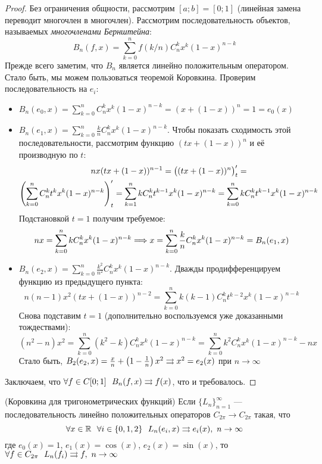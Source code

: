\begin{proof}
	Без ограничения общности, рассмотрим $[a; b] = [0; 1]$ (линейная замена переводит многочлен в многочлен). Рассмотрим последовательность объектов, называемых \textit{многочленами Бернштейна}:
	\[
		B_n(f, x) = \sum_{k = 0}^n f(k / n) C_n^k x^k(1 - x)^{n - k}
	\]
	Прежде всего заметим, что $B_n$ является линейно положительным оператором. Стало быть, мы можем пользоваться теоремой Коровкина. Проверим последовательность на $e_i$:
	\begin{itemize}
		\item \(B_n(e_0, x) = \sum_{k = 0}^n C_n^k x^k(1 - x)^{n - k} = (x + (1 - x))^n = 1 = e_0(x)\)
		
		\item \(B_n(e_1, x) = \sum_{k = 0}^n \frac{k}{n} C_n^k x^k(1 - x)^{n - k}\). Чтобы показать сходимость этой последовательности, рассмотрим функцию $(tx + (1 - x))^n$ и её производную по $t$:
		\begin{multline*}
			nx(tx + (1 - x))^{n - 1} = \big((tx + (1 - x))^n\big)'_t =
			\\
			\left(\sum_{k = 0}^n C_n^k t^k x^k (1 - x)^{n - k}\right)'_t = \sum_{k = 1}^n kC_n^k t^{k - 1}x^k(1 - x)^{n - k} = \sum_{k = 0}^n kC_n^k t^{k - 1}x^k(1 - x)^{n - k}
		\end{multline*}
		Подстановкой $t = 1$ получим требуемое:
		\[
			nx = \sum_{k = 0}^n kC_n^kx^k(1 - x)^{n - k} \Longrightarrow x = \sum_{k = 0}^n \frac{k}{n} C_n^k x^k(1 - x)^{n - k} = B_n(e_1, x)
		\]
		
		\item \(B_n(e_2, x) = \sum_{k = 0}^n \frac{k^2}{n^2} C_n^k x^k(1 - x)^{n - k}\). Дважды продифференцируем функцию из предыдущего пункта:
		\[
			n(n - 1)x^2(tx + (1 - x))^{n - 2} = \sum_{k = 0}^n k(k - 1)C_n^k t^{k - 2} x^k(1 - x)^{n - k}
		\]
		Снова подставим $t = 1$ (дополнительно воспользуемся уже доказанными тождествами):
		\[
			(n^2 - n)x^2 = \sum_{k = 0}^n (k^2 - k)C_n^k x^k(1 - x)^{n - k} = \sum_{k = 0}^n k^2C_n^k x^k(1 - x)^{n - k} - nx
		\]
		Стало быть, $B_2(e_2, x) = \frac{x}{n} + \left(1 - \frac{1}{n}\right)x^2 \rightrightarrows x^2 = e_2(x)$ при $n \to \infty$
	\end{itemize}
	Заключаем, что $\forall f \in C[0; 1]\ \ B_n(f, x) \rra f(x)$, что и требовалось.
\end{proof}

\begin{theorem} (Коровкина для тригонометрических функций)
	Если $\{L_n\}_{n = 1}^\infty$ --- последовательность линейно положительных операторов $C_{2\pi} \to C_{2\pi}$ такая, что
	\[
		\forall x \in \mathbb{R}\ \ \forall i \in \{0, 1, 2\}\ \ L_n(e_i, x) \rightrightarrows e_i(x),\ n \to \infty
	\]
	где $e_0(x) = 1$, $e_1(x) = \cos(x)$, $e_2(x) = \sin(x)$, то $\forall f \in C_{2\pi}\ \ L_n(f_i) \rightrightarrows f,\ n \to \infty$
\end{theorem}

